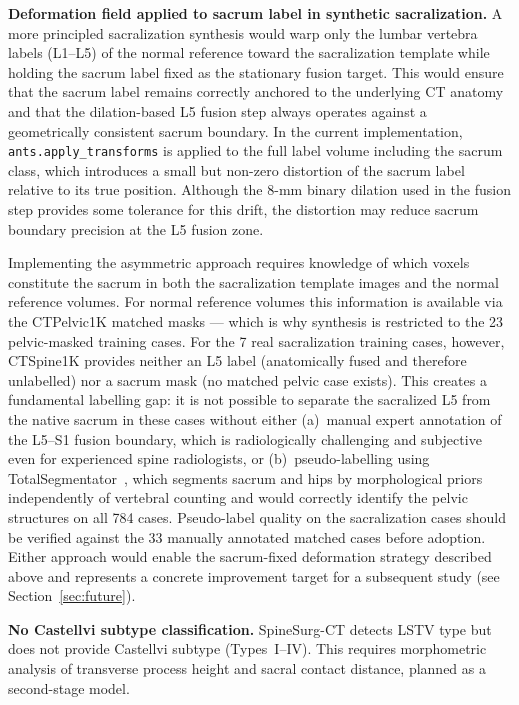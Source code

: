 \documentclass{article}
\begin{document}
\textbf{Deformation field applied to sacrum label in synthetic sacralization.}
A more principled sacralization synthesis would warp only the lumbar vertebra
labels (L1--L5) of the normal reference toward the sacralization template while
holding the sacrum label fixed as the stationary fusion target. This would
ensure that the sacrum label remains correctly anchored to the underlying CT
anatomy and that the dilation-based L5 fusion step always operates against a
geometrically consistent sacrum boundary. In the current implementation,
\texttt{ants.apply\_transforms} is applied to the full label volume including
the sacrum class, which introduces a small but non-zero distortion of the sacrum
label relative to its true position. Although the 8-mm binary dilation used in
the fusion step provides some tolerance for this drift, the distortion may
reduce sacrum boundary precision at the L5 fusion zone.

Implementing the asymmetric approach requires knowledge of which voxels
constitute the sacrum in both the sacralization template images and the normal
reference volumes. For normal reference volumes this information is available
via the CTPelvic1K matched masks --- which is why synthesis is restricted to
the 23 pelvic-masked training cases. For the 7 real sacralization training cases,
however, CTSpine1K provides neither an L5 label (anatomically fused and therefore
unlabelled) nor a sacrum mask (no matched pelvic case exists). This creates a
fundamental labelling gap: it is not possible to separate the sacralized L5 from
the native sacrum in these cases without either (a)~manual expert annotation of
the L5--S1 fusion boundary, which is radiologically challenging and subjective
even for experienced spine radiologists, or (b)~pseudo-labelling using
TotalSegmentator~\citep{wasserthal2023}, which segments sacrum and hips by
morphological priors independently of vertebral counting and would correctly
identify the pelvic structures on all 784 cases. Pseudo-label quality on the
sacralization cases should be verified against the 33 manually annotated matched
cases before adoption. Either approach would enable the sacrum-fixed deformation
strategy described above and represents a concrete improvement target for a
subsequent study (see Section~\ref{sec:future}).

\textbf{No Castellvi subtype classification.} SpineSurg-CT detects LSTV type
but does not provide Castellvi subtype (Types~I--IV). This requires morphometric
analysis of transverse process height and sacral contact distance, planned as a
second-stage model.
\end{document}
